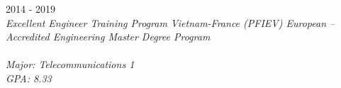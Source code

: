  \hfill 2014 - 2019 \\
\textit{Excellent Engineer Training Program Vietnam-France (PFIEV)      European – Accredited Engineering Master Degree Program}  \\
  \\
\textit{Major: Telecommunications 1} \\
\textit{GPA: 8.33} \\